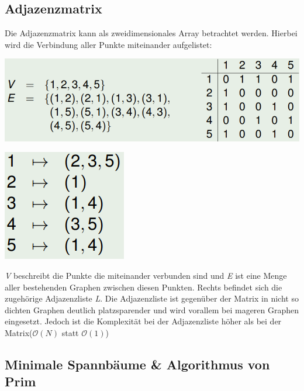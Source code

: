 \documentclass[12pt,a4paper]{article}
\begin{document}
\subsection{Adjazenzmatrix}
Die Adjazenzmatrix kann als zweidimensionales Array betrachtet werden. Hierbei wird die Verbindung aller Punkte miteinander aufgelistet:\newline
\newline
\begin{minipage}[c]{0.7\textwidth}
	\begin{center}
		\includegraphics[scale=.8]{Bilder/Adjazenzmatrix.PNG}
	\end{center}
\end{minipage}
\begin{minipage}[c]{0.3\textwidth}
	\begin{center}
		\includegraphics[scale=.95]{Bilder/Adjazenzliste.PNG}
	\end{center}
\end{minipage}\vspace{.5cm}
\textit{V} beschreibt die Punkte die miteinander verbunden sind und \textit{E} ist eine Menge aller bestehenden Graphen zwischen diesen Punkten. Rechts befindet sich die zugehörige Adjazenzliste \textit{L}.\newline
Die Adjazenzliste ist gegenüber der Matrix in nicht so dichten Graphen deutlich platzsparender und wird vorallem bei mageren Graphen eingesetzt. Jedoch ist die Komplexität bei der Adjazenzliste höher als bei der Matrix($\mathcal{O}(N)$ statt $\mathcal{O}(1)$)

\subsection{Minimale Spannbäume \& Algorithmus von Prim}
\end{document}
